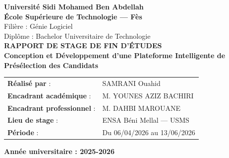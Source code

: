 \documentclass[12pt,a4paper]{report}
\begin{document}
\begin{titlepage}
    \centering
    
    \vspace*{1cm}
    
    {\large\textbf{Université Sidi Mohamed Ben Abdellah}} \\[0.5cm]
    {\large\textbf{École Supérieure de Technologie --- Fès}} \\[1.5cm]
    
    {\large Filière : Génie Logiciel} \\[0.5cm]
    {\large Diplôme : Bachelor Universitaire de Technologie} \\[2cm]
    
    {\huge \textbf{RAPPORT DE STAGE DE FIN D'ÉTUDES}} \\[1.5cm]
    
    {\Large \textbf{Conception et Développement d'une Plateforme Intelligente de Présélection des Candidats}} \\[2.5cm]
    
    \begin{tabular}{ll}
        \textbf{Réalisé par} : & SAMRANI Ouahid \\[0.5cm]
        \textbf{Encadrant académique} : & M. YOUNES AZIZ BACHIRI \\[0.5cm]
        \textbf{Encadrant professionnel} : & M. DAHBI MAROUANE \\[0.5cm]
        \textbf{Lieu de stage} : & ENSA Béni Mellal --- USMS \\[0.5cm]
        \textbf{Période} : & Du 06/04/2026 au 13/06/2026 \\
    \end{tabular}
    
    \vfill
    
    {\large \textbf{Année universitaire : 2025-2026}}
    
    \vspace*{1cm}
\end{titlepage}






\tableofcontents
\listoffigures
\listoftables


\clearpage










\end{document}
